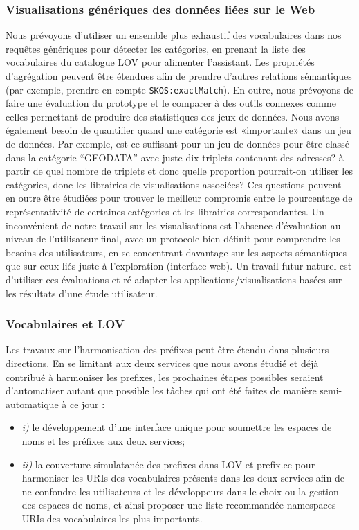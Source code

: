 \subsubsection*{Visualisations g\'{e}n\'{e}riques des donn\'{e}es li\'{e}es sur le Web}
Nous pr\'{e}voyons d'utiliser un ensemble plus exhaustif des vocabulaires dans nos requ\^{e}tes g\'{e}n\'{e}riques pour d\'{e}tecter les cat\'{e}gories, en prenant la liste des vocabulaires du catalogue LOV pour alimenter l'assistant. Les propri\'{e}t\'{e}s d'agr\'{e}gation peuvent \^{e}tre \'{e}tendues afin de prendre d'autres relations s\'{e}mantiques (par exemple, prendre en compte \texttt{SKOS:exactMatch}). En outre, nous pr\'{e}voyons de faire une \'{e}valuation du prototype et le comparer \`{a} des outils connexes comme celles permettant de produire des statistiques des jeux de donn\'{e}es. Nous avons \'{e}galement besoin de quantifier quand une cat\'{e}gorie est «importante» dans un jeu de donn\'{e}es. Par exemple, est-ce suffisant pour un jeu de donn\'{e}es pour \^{e}tre class\'{e} dans la cat\'{e}gorie ``GEODATA'' avec juste dix triplets contenant des adresses? \`{a} partir de quel nombre de triplets et donc quelle proportion pourrait-on utiliser les cat\'{e}gories, donc les librairies de visualisations associ\'{e}es? Ces questions peuvent en outre \^{e}tre \'{e}tudi\'{e}es pour trouver le meilleur compromis entre le pourcentage de repr\'{e}sentativit\'{e} de certaines cat\'{e}gories et les librairies correspondantes. Un  inconv\'{e}nient de notre travail sur les visualisations est l'absence d'\'{e}valuation au niveau de l'utilisateur final, avec un protocole bien d\'{e}finit pour comprendre les besoins des utilisateurs, en se concentrant davantage sur les aspects s\'{e}mantiques que sur ceux li\'{e}s juste \`{a} l'exploration (interface web). Un travail futur naturel est d'utiliser ces \'{e}valuations et r\'{e}-adapter les applications/visualisations bas\'{e}es sur les r\'{e}sultats d'une \'{e}tude utilisateur.

\subsubsection*{Vocabulaires et LOV}
\label{sec:nextSteps}
Les travaux sur l'harmonisation des pr\'{e}fixes peut \^{e}tre \'{e}tendu dans plusieurs directions. En se limitant aux deux services que nous avons \'{e}tudi\'{e} et d\'{e}j\`{a} contribu\'{e} \`{a} harmoniser les prefixes, les prochaines \'{e}tapes possibles seraient d'automatiser autant que possible les t\^{a}ches qui ont \'{e}t\'{e} faites de mani\`{e}re semi-automatique \`{a} ce jour :
\begin{itemize}
 \item \emph{i)} le d\'{e}veloppement d'une interface unique pour soumettre les espaces de noms et les pr\'{e}fixes aux deux services;
 \item \emph{ii)} la couverture simulatan\'{e}e des prefixes dans LOV et prefix.cc pour harmoniser les URIs des vocabulaires pr\'{e}sents dans les deux services afin de ne confondre les utilisateurs et les d\'{e}veloppeurs dans le choix ou la gestion des espaces de noms, et ainsi proposer une liste recommand\'{e}e namespaces-URIs des vocabulaires les plus importants.
\end{itemize}

